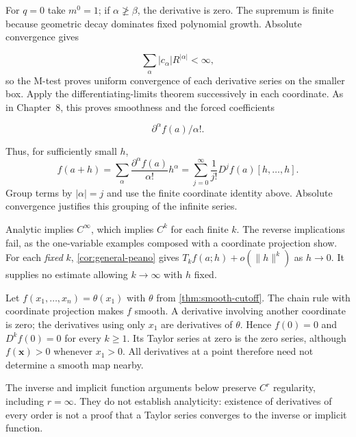 For $q=0$ take $m^0=1$; if $\alpha\not\geq\beta$, the derivative is
zero. The supremum is finite because geometric decay dominates fixed
polynomial growth. Absolute convergence gives

\[
\sum_\alpha|c_\alpha|R^{|\alpha|}<\infty,
\]
 so the M-test proves uniform
convergence of each derivative series on the smaller box. Apply the
differentiating-limits theorem successively in each coordinate. As in
Chapter~8, this proves smoothness and the forced coefficients

\[
\partial^\alpha f(a)/\alpha!.
\]

Thus, for sufficiently small $h$,
\[
f(a+h)=\sum_\alpha\frac{\partial^\alpha f(a)}{\alpha!}h^\alpha
=\sum_{j=0}^\infty\frac1{j!}D^jf(a)[h,\ldots,h].
\]
Group terms by $|\alpha|=j$ and use the finite coordinate identity above.
Absolute convergence justifies this grouping of the infinite series.

Analytic implies $C^\infty$, which implies $C^k$ for each finite $k$.
The reverse implications fail, as the one-variable examples composed
with a coordinate projection show. For each \emph{fixed} $k$,
\cref{cor:general-peano} gives $T_kf(a;h)+o(\|h\|^k)$ as $h\to0$.
It supplies no estimate allowing $k\to\infty$ with $h$ fixed.
\begin{example}
Let $f(x_1,\ldots,x_n)=\theta(x_1)$ with $\theta$ from
\cref{thm:smooth-cutoff}. The chain rule with coordinate projection
makes $f$ smooth. A derivative involving another coordinate is zero;
the derivatives using only $x_1$ are derivatives of $\theta$.
Hence $f(0)=0$ and $D^kf(0)=0$ for every $k\geq1$. Its Taylor series
at zero is the zero series, although $f(\mathbf{x})>0$ whenever $x_1>0$.
All derivatives at a point therefore need not determine a smooth map nearby.
\end{example}
The inverse and implicit function arguments below preserve $C^r$
regularity, including $r=\infty$. They do not establish analyticity:
existence of derivatives of every order is not a proof that a Taylor
series converges to the inverse or implicit function.

